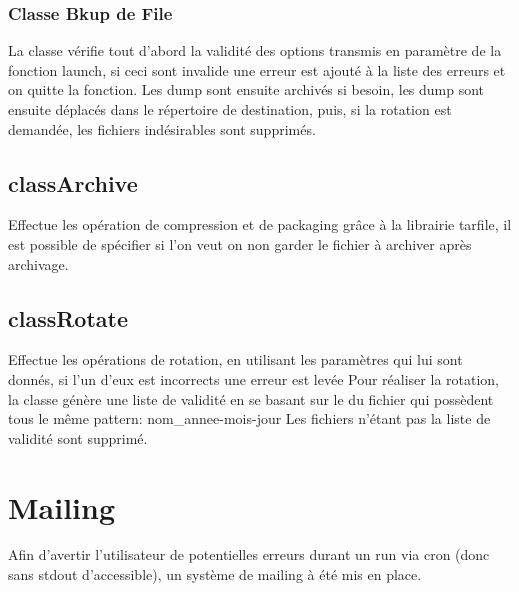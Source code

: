 \subsubsection*{Classe Bkup de File}
La classe vérifie tout d'abord la validité des options transmis en paramètre de la fonction launch, si ceci sont invalide une erreur est ajouté à la liste des erreurs et on quitte la fonction.
Les dump sont ensuite archivés si besoin, les dump sont ensuite déplacés dans le répertoire de destination, puis, si la rotation est demandée, les fichiers indésirables sont supprimés.


\subsection*{classArchive}
Effectue les opération de compression et de packaging grâce à la librairie tarfile, il est possible de spécifier si l'on veut on non garder le fichier à archiver après archivage.

\subsection*{classRotate}
Effectue les opérations de rotation, en utilisant les paramètres qui lui sont donnés, si l'un d'eux est incorrects une erreur est levée
Pour réaliser la rotation, la classe génère une liste de validité en se basant sur le du fichier qui possèdent tous le même pattern: nom\_annee-mois-jour
Les fichiers n'étant pas la liste de validité sont supprimé.


\section{Mailing}
Afin d'avertir l'utilisateur de potentielles erreurs durant un run via cron (donc sans stdout d'accessible), un système de mailing à été mis en place.

